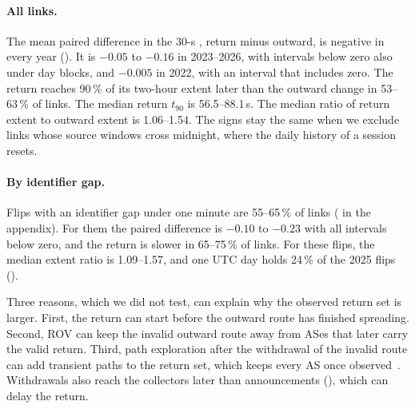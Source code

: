 \paragraph{All links.}
The mean paired difference in the 30-s \floor, return minus outward, is negative in every year ().
It is $-0.05$ to $-0.16$ in 2023--2026, with intervals below zero also under day blocks, and $-0.005$ in 2022, with an interval that includes zero.
The return reaches 90\,\% of its two-hour extent later than the outward change in 53--63\,\% of links.
The median return $t_{90}$ is 56.5--88.1\,s.
The median ratio of return extent to outward extent is 1.06--1.54.
The signs stay the same when we exclude links whose source windows cross midnight, where the daily history of a session resets.


\paragraph{By identifier gap.}
Flips with an identifier gap under one minute are 55--65\,\% of links ( in the appendix).
For them the paired difference is $-0.10$ to $-0.23$ with all intervals below zero, and the return is slower in 65--75\,\% of links.
For these flips, the median extent ratio is 1.09--1.57, and one UTC day holds 24\,\% of the 2025 flips ().

Three reasons, which we did not test, can explain why the observed return set is larger.
First, the return can start before the outward route has finished spreading.
Second, ROV can keep the invalid outward route away from ASes that later carry the valid return.
Third, path exploration after the withdrawal of the invalid route can add transient paths to the return set, which keeps every AS once observed~\cite{labovitz2000delayed}.
Withdrawals also reach the collectors later than announcements (), which can delay the return.

